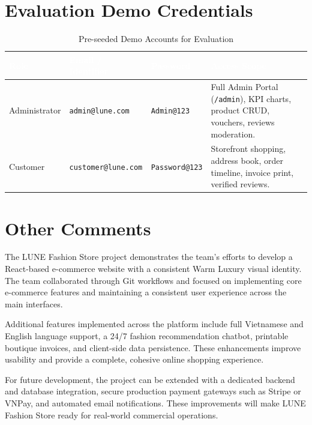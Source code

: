 \documentclass[12pt,a4paper,oneside]{report}
\begin{document}
\section{Evaluation Demo Credentials}
\begin{table}[H]
\centering
\begin{tabular}{|p{2.6cm}|p{3.6cm}|p{2.6cm}|p{6.1cm}|}
\hline
\rowcolor{PrimaryBrown}
\textcolor{white}{\textbf{Role}} & \textcolor{white}{\textbf{Email / Identifier}} & \textcolor{white}{\textbf{Password}} & \textcolor{white}{\textbf{Access Scope}} \\
\hline
Administrator & \texttt{admin@lune.com} & \texttt{Admin@123} & Full Admin Portal (\texttt{/admin}), KPI charts, product CRUD, vouchers, reviews moderation. \\
\hline
Customer & \texttt{customer@lune.com} & \texttt{Password@123} & Storefront shopping, address book, order timeline, invoice print, verified reviews. \\
\hline
\end{tabular}
\caption{Pre-seeded Demo Accounts for Evaluation}
\end{table}

\section{Other Comments}
The LUNE Fashion Store project demonstrates the team's efforts to develop a React-based e-commerce website with a consistent Warm Luxury visual identity. The team collaborated through Git workflows and focused on implementing core e-commerce features and maintaining a consistent user experience across the main interfaces.

Additional features implemented across the platform include full Vietnamese and English language support, a 24/7 fashion recommendation chatbot, printable boutique invoices, and client-side data persistence. These enhancements improve usability and provide a complete, cohesive online shopping experience.

For future development, the project can be extended with a dedicated backend and database integration, secure production payment gateways such as Stripe or VNPay, and automated email notifications. These improvements will make LUNE Fashion Store ready for real-world commercial operations.
\end{document}
